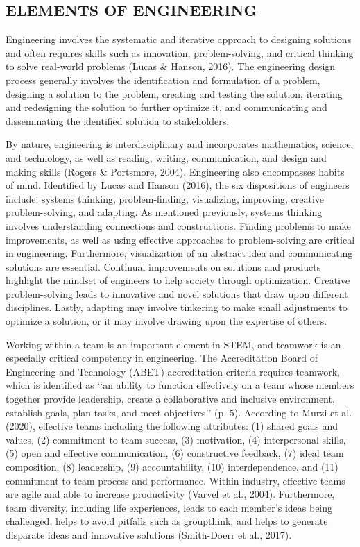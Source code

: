 \documentclass[11.5pt]{sig-alternate}
\begin{document}
\begin{large}
\section*{ELEMENTS OF ENGINEERING}

Engineering involves the systematic and iterative approach to designing solutions and often requires skills such as innovation, problem-solving, and critical thinking to solve real-world problems (Lucas \& Hanson, 2016). The engineering design process generally involves the identification and formulation of a problem, designing a solution to the problem, creating and testing the solution, iterating and redesigning the solution to further optimize it, and communicating and disseminating the identified solution to stakeholders. 

By nature, engineering is interdisciplinary and incorporates mathematics, science, and technology, as well as reading, writing, communication, and design and making skills (Rogers \& Portsmore, 2004). Engineering also encompasses habits of mind. Identified by Lucas and Hanson (2016), the six dispositions of engineers include: systems thinking, problem-finding, visualizing, improving, creative problem-solving, and adapting. As mentioned previously, systems thinking involves understanding connections and constructions. Finding problems to make improvements, as well as using effective approaches to problem-solving are critical in engineering. Furthermore, visualization of an abstract idea and communicating solutions are essential. Continual improvements on solutions and products highlight the mindset of engineers to help society through optimization. Creative problem-solving leads to innovative and novel solutions that draw upon different disciplines. Lastly, adapting may involve tinkering to make small adjustments to optimize a solution, or it may involve drawing upon the expertise of others. 

Working within a team is an important element in STEM, and teamwork is an especially critical competency in engineering. The Accreditation Board of Engineering and Technology (ABET) accreditation criteria requires teamwork, which is identified as ‘‘an ability to function effectively on a team whose members together provide leadership, create a collaborative and inclusive environment, establish goals, plan tasks, and meet objectives’’ (p. 5). According to Murzi et al. (2020), effective teams including the following attributes: (1) shared goals and values, (2) commitment to team success, (3) motivation, (4) interpersonal skills, (5) open and effective communication, (6) constructive feedback, (7) ideal team composition, (8) leadership, (9) accountability, (10) interdependence, and (11) commitment to team process and performance. Within industry, effective teams are agile and able to increase productivity (Varvel et al., 2004). Furthermore, team diversity, including life experiences, leads to each member’s ideas being challenged, helps to avoid pitfalls such as groupthink, and helps to generate disparate ideas and innovative solutions (Smith-Doerr et al., 2017).


\end{large}
\end{document}
